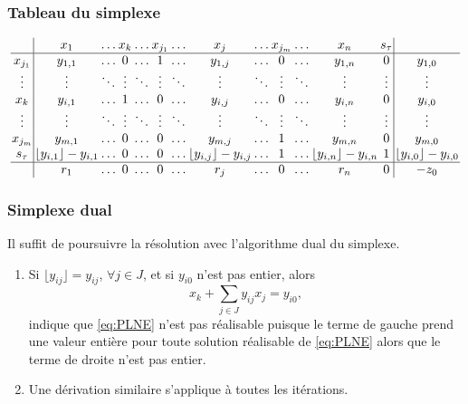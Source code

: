 \documentclass[usepdftitle=false, aspectratio=169]{beamer}
\begin{document}
\begin{frame}
\frametitle{Tableau du simplexe}

\begin{footnotesize}
	$$
\arraycolsep=1pt
	\begin{array}{c|cccccccccccc|c}
		& x_1 & \ldots & x_k & \ldots & x_{j_1}& \ldots & x_j & \ldots & x_{j_m} & \ldots & x_n & s_{\tau} \\
		\hline
		x_{j_1}& y_{1,1} & \ldots & 0 & \ldots & 1 & \ldots & y_{1,j} & \ldots & 0 & \ldots & y_{1,n} & 0 & y_{1,0} \\
		\vdots & \vdots & \ddots & \vdots & \ddots & \vdots & \ddots & \vdots & \ddots & \vdots & \ddots & \vdots & \vdots & \vdots \\
		x_k & y_{i,1} & \ldots & 1 & \ldots & 0 & \ldots & y_{i,j} & \ldots & 0 & \ldots & y_{i,n} & 0 & y_{i,0} \\
		\vdots & \vdots & \ddots & \vdots & \ddots & \vdots & \ddots & \vdots & \ddots & \vdots & \ddots & \vdots & \vdots & \vdots \\
		x_{j_m} & y_{m,1} & \ldots & 0 & \ldots & 0 & \ldots & y_{m,j} & \ldots & 1 & \ldots & y_{m,n} & 0 & y_{m,0} \\
		s_{\tau} & \lfloor y_{i,1} \rfloor - y_{i,1} & \ldots & 0 & \ldots & 0 & \ldots & \lfloor y_{i,j} \rfloor - y_{i,j} & \ldots & 1 & \ldots & \lfloor y_{i,n} \rfloor - y_{i,n} & 1 & \lfloor y_{i,0} \rfloor - y_{i,0} \\
		\hline
		& r_1 & \ldots & 0 & \ldots & 0 & \ldots & r_j & \ldots & 0 & \ldots & r_n & 0 & -z_0
	\end{array}
	$$
\end{footnotesize}

\end{frame}

\begin{frame}
\frametitle{Simplexe dual}

Il suffit de poursuivre la résolution avec l'algorithme dual du simplexe.

\mbox{}

\begin{enumerate}
	\item
	Si $\lfloor y_{ij} \rfloor = y_{ij}$, $\forall j \in J$, et si $y_{i0}$ n'est pas entier, alors
    $$
	x_k + \sum_{j \in J} y_{ij} x_j = y_{i0},
	$$
	indique que \eqref{eq:PLNE} n'est pas réalisable puisque le terme de gauche prend une
	valeur entière pour toute solution réalisable de \eqref{eq:PLNE} alors que le terme de
	droite n'est pas entier.
	\item
	Une dérivation similaire s'applique à toutes les itérations.
\end{enumerate}

\end{frame}
\end{document}
